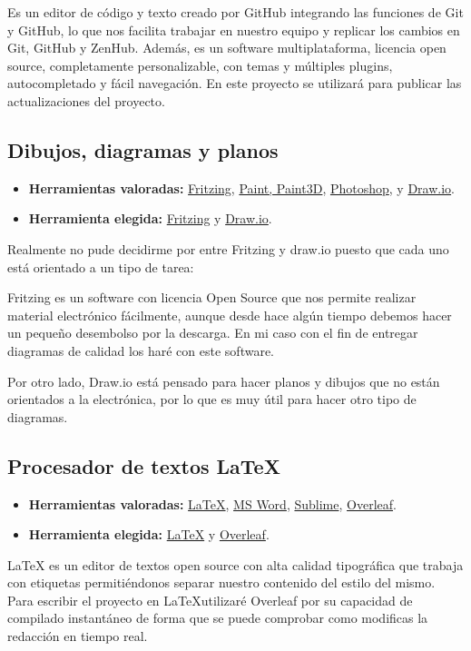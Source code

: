 Es un editor de código y texto creado por GitHub integrando las funciones de Git y GitHub, lo que nos facilita trabajar en nuestro equipo y replicar los cambios en Git, GitHub y ZenHub. Además, es un software multiplataforma, licencia open source, completamente personalizable, con temas y múltiples plugins, autocompletado y fácil navegación.
En este proyecto se utilizará para publicar las actualizaciones del proyecto.



\subsection{Dibujos, diagramas y planos}\label{4:plataformasDibujosYPlanos}
\begin{itemize}
    \item \textbf{Herramientas valoradas:} \href{https://fritzing.org/}{Fritzing}, \href{https://support.microsoft.com/es-es/windows/obtener-microsoft-paint-a6b9578c-ed1c-5b09-0699-4ed8115f9aa9}{Paint, Paint3D}, \href{https://www.adobe.com/es/products/photoshop.html}{Photoshop}, y \href{www.draw.io}{Draw.io}.
    \item \textbf{Herramienta elegida:} \href{https://fritzing.org/}{Fritzing} y \href{www.draw.io}{Draw.io}.
\end{itemize}
Realmente no pude decidirme por entre Fritzing y draw.io puesto que cada uno está orientado a un tipo de tarea:

Fritzing es un software con licencia Open Source\cite{misc:OpenSource} que nos permite realizar material electrónico fácilmente, aunque desde hace algún tiempo debemos hacer un pequeño desembolso por la descarga. En mi caso con el fin de entregar diagramas de calidad los haré con este software.

Por otro lado, Draw.io está pensado para hacer planos y dibujos que no están orientados a la electrónica, por lo que es muy útil para hacer otro tipo de diagramas.

\subsection{Procesador de textos \LaTeX}\label{4:latex}
\begin{itemize}
    \item \textbf{Herramientas valoradas:} \href{https://www.latex-project.org/}{\LaTeX}, \href{https://www.microsoft.com/es-es/microsoft-365/word}{MS Word}, \href{https://www.sublimetext.com/}{Sublime}, \href{https://www.overleaf.com/}{Overleaf}.
    \item \textbf{Herramienta elegida:} \href{https://www.latex-project.org/}{\LaTeX} y \href{https://www.overleaf.com/}{Overleaf}.
\end{itemize}
\LaTeX{} es un editor de textos open source\cite{misc:OpenSource} con alta calidad tipográfica que trabaja con etiquetas permitiéndonos separar nuestro contenido del estilo del mismo. Para escribir el proyecto en \LaTeX utilizaré Overleaf por su capacidad de compilado instantáneo de forma que se puede comprobar como modificas la redacción en tiempo real.

